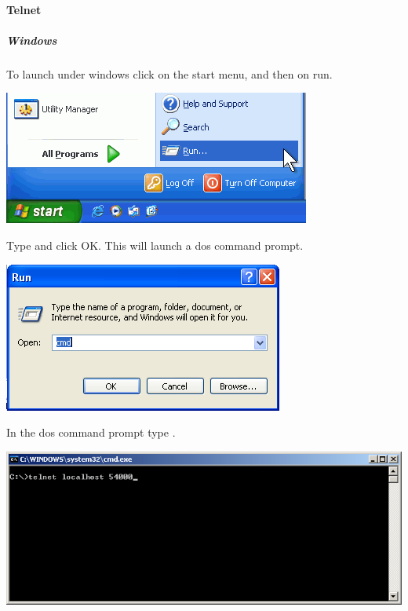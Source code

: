\paragraph{Telnet}

\subparagraph{Windows}

To launch  under windows click on the start menu, and
then on run.

\begin{center}
  \includegraphics[scale=.6]{img/webots/click-run-windows}
\end{center}

Type  and click OK. This will launch a dos command prompt.

\begin{center}
  \includegraphics{img/webots/run-cmd-windows}
\end{center}

In the dos command prompt type .

\begin{center}
  \includegraphics[width=.8\linewidth]{img/webots/telnet-windows}
\end{center}

